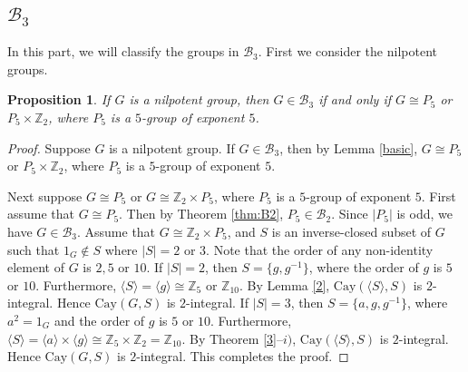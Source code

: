 \documentclass[12pt,a4paper]{article}
\newtheorem{pro}[thm]{Proposition}
\begin{document}
	\subsection{$\mathcal{B}_3$}
	In this part, we will classify the groups in $\mathcal{B}_3$. First we consider the nilpotent groups.
	\begin{pro}\label{pro:nipoltentB3}
		If $G$ is a nilpotent group, then $G\in \mathcal{B}_3$ if and only if $G\cong P_5$ or $P_5\times \mathbb{Z}_2$, where $P_5$ is a $5$-group of exponent $5$.
	\end{pro}
	\begin{proof}
		Suppose $G$ is a nilpotent group.
		If $G\in \mathcal{B}_3$, then by Lemma \ref{basic}, $G\cong P_5$ or $P_5\times \mathbb{Z}_2$, where $P_5$ is a $5$-group of exponent $5$.
		
		Next suppose $G\cong P_5$ or $G\cong \mathbb{Z}_2\times P_5$, where $P_5$ is a $5$-group of exponent $5$.
		First assume that $G\cong P_5$.
		Then by Theorem \ref{thm:B2}, $P_5\in \mathcal{B}_2$.
		Since $|P_5|$ is odd, we have $G\in \mathcal{B}_3$.
		Assume that $G\cong \mathbb{Z}_2\times P_5$, and $S$ is an inverse-closed subset of $G$ such that $1_G\notin S$ where $|S|=2$ or $3$.
		Note that the order of any non-identity element of $G$ is $2,5$ or $10$.
		If $|S|=2$, then $S=\{g,g^{-1}\}$, where the order of $g$ is $5$ or $10$.
		Furthermore, $\langle S\rangle=\langle g\rangle\cong \mathbb{Z}_5$ or $\mathbb{Z}_{10}$.
		By Lemma \ref{2}, $\mathrm{Cay}(\langle S\rangle,S)$ is $2$-integral.
		Hence $\mathrm{Cay}(G,S)$ is $2$-integral.
		If $|S|=3$, then $S=\{a,g,g^{-1}\}$, where $a^2=1_G$ and the order of $g$ is $5$ or $10$.	
		Furthermore, $\langle S\rangle=\langle a\rangle\times \langle g\rangle \cong \mathbb{Z}_5\times \mathbb{Z}_2=\mathbb{Z}_{10}$.
		By Theorem \ref{3}--$i)$, $\mathrm{Cay}(\langle S\rangle,S)$ is $2$-integral.
		Hence $\mathrm{Cay}(G,S)$ is $2$-integral.
		This completes the proof.
	\end{proof}
	
\end{document}
